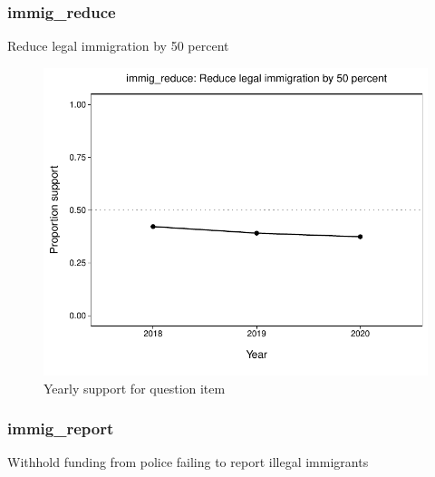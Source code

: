 \documentclass[
  12pt]{article}
\begin{document}
\hypertarget{immig_reduce}{%
\subsubsection{immig\_reduce}\label{immig_reduce}}

Reduce legal immigration by 50 percent

\begin{figure}

{\centering \includegraphics{error-checking_files/figure-latex/unnamed-chunk-3-25} 

}

\caption{Yearly support for question item}\label{fig:unnamed-chunk-3-25}
\end{figure}

\hypertarget{immig_report}{%
\subsubsection{immig\_report}\label{immig_report}}

Withhold funding from police failing to report illegal immigrants
\end{document}
